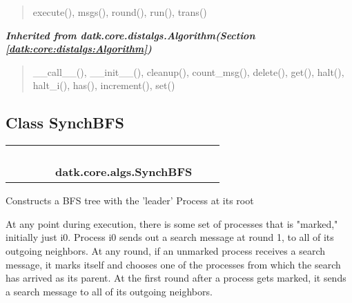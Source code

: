 \begin{quote}
execute(), msgs(), round(), run(), trans()
\end{quote}

\large{\textbf{\textit{Inherited from datk.core.distalgs.Algorithm\textit{(Section \ref{datk:core:distalgs:Algorithm})}}}}

\begin{quote}
\_\_call\_\_(), \_\_init\_\_(), cleanup(), count\_msg(), delete(), get(), halt(), halt\_i(), has(), increment(), set()
\end{quote}


\subsection{Class SynchBFS}

    \label{datk:core:algs:SynchBFS}
\begin{tabular}{cccccccc}
\multicolumn{2}{r}{\settowidth{\BCL}{datk.core.distalgs.Algorithm}\multirow{2}{\BCL}{datk.core.distalgs.Algorithm}}
&&
&&
  \\\cline{3-3}
  &&\multicolumn{1}{c|}{}
&&
&&
  \\
\multicolumn{4}{r}{\settowidth{\BCL}{datk.core.distalgs.Synchronous\_Algorithm}\multirow{2}{\BCL}{datk.core.distalgs.Synchronous\_Algorithm}}
&&
  \\\cline{5-5}
  &&&&\multicolumn{1}{c|}{}
&&
  \\
&&&&\multicolumn{2}{l}{\textbf{datk.core.algs.SynchBFS}}
\end{tabular}

Constructs a BFS tree with the 'leader' Process at its root

At any point during execution, there is some set of processes that is 
"marked," initially just i0. Process i0 sends out a search message at round
1, to all of its outgoing neighbors. At any round, if an unmarked process 
receives a search message, it marks itself and chooses one of the processes
from which the search has arrived as its parent. At the first round after a
process gets marked, it sends a search message to all of its outgoing 
neighbors.

